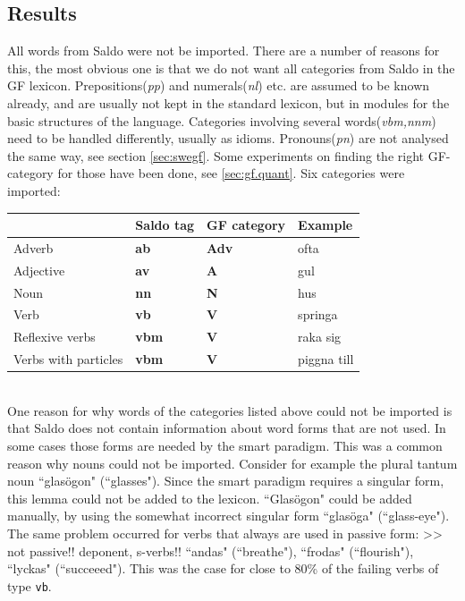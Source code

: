 \documentclass{report}
\begin{document}
\subsection{Results}
All words from Saldo were not be imported. There are a number of reasons
for this, the most obvious one is that we do not want all categories from
Saldo in the GF lexicon. Prepositions(\emph{pp}) and numerals(\emph{nl}) etc. are
assumed to be known already,
and are usually not kept in the standard lexicon, but in modules for the basic
structures of the language. Categories involving several words(\emph{vbm,nnm})
need to be handled differently, usually as idioms. Pronouns(\emph{pn}) are not  
analysed the same way, see section \ref{sec:swegf}. Some experiments on finding
the right GF-category for those have been done, see \ref{sec:gf.quant}.
Six categories were imported: \\
\begin{tabular}{l|lll}
& Saldo tag & GF category & Example \\
\hline
 Adverb & \textbf{ab} &\textbf{Adv} & ofta \\
 Adjective&\textbf{av} &    \textbf{A} & gul\\
 Noun & \textbf{nn} &\textbf{N} & hus\\
 Verb & \textbf{vb} &\textbf{V} & springa\\
 Reflexive verbs  &\textbf{vbm}& \textbf{V} & raka sig\\
 Verbs with particles &\textbf{vbm}& \textbf{V}  &  piggna till\\
\end{tabular}\\

%
One reason for why words of the categories listed above could not be imported
is that Saldo does not contain information about word forms that are not used.
In some cases those forms are needed by the smart paradigm. 
This was a common reason why nouns could not be imported. 
Consider for example
the plural tantum %
noun ``glasögon" (``glasses"). Since the smart paradigm
requires a singular form, this lemma could not be added to the lexicon. ``Glasögon" could
be added manually, by using the somewhat incorrect singular form ``glasöga" (``glass-eye").
The same problem occurred for verbs that always are used in passive form:
>> not passive!! deponent, s-verbs!!
``andas" (``breathe"), ``frodas" (``flourish"), ``lyckas" (``succeeed"). This
was the case for close to 80\% of the failing verbs of type \verb_vb_.
\end{document}
